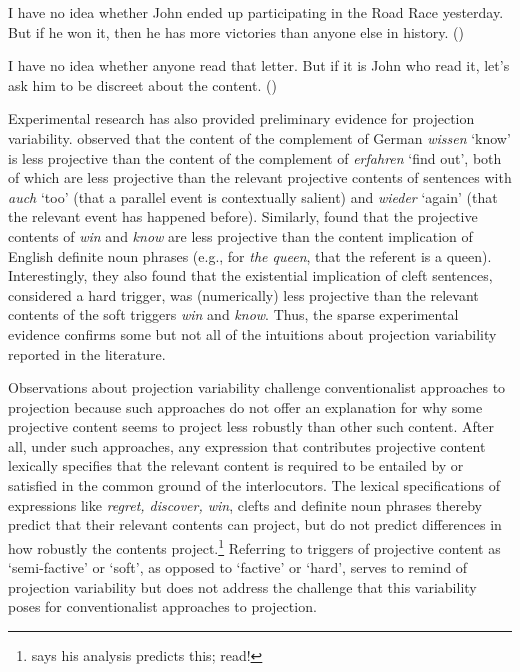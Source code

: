 \documentclass[11pt,fleqn]{article}
\newcommand{\6}{\mbox{$[\hspace*{-.6mm}[$}}
\newcommand{\9}{\mbox{$]\hspace*{-.6mm}]$}}
\def\infelic{{\leavevmode\llap{\#}}}
\begin{document}
\begin{exe}
\ex\label{hardsoft}
\begin{xlist}

\ex I have no idea whether John ended up participating in the Road Race yesterday. But if he won it, then he has more victories than anyone else in history. \hfill (\citealt[39]{abusch10})

\ex\infelic I have no idea whether anyone read that letter. But if it is John
who read it, let's ask him to be discreet about the content. \hfill (\citealt[40]{abusch10})

\end{xlist}
\end{exe}

Experimental research has also provided preliminary evidence for projection variability. \citet{xue-onea11} observed that the content of the complement of German {\em wissen} `know' is less projective than the content of the complement of {\em erfahren} `find out', both of which are less projective than the relevant projective contents of sentences with {\em auch} `too' (that a parallel event is contextually salient) and {\em wieder} `again' (that the relevant event has happened before). Similarly, \citet{smith-hall11} found that the projective contents of {\em win} and {\em know} are less projective than the content implication of English definite noun phrases (e.g., for {\em the queen}, that the referent is a queen). Interestingly, they also found that the existential implication of cleft sentences, considered a hard trigger, was (numerically) less projective than the relevant contents of the soft triggers {\em win} and {\em know}. Thus, the sparse experimental evidence confirms some but not all of the intuitions about projection variability reported in the literature.

Observations about projection variability challenge conventionalist approaches to projection because such approaches do not offer an explanation for why some projective content seems to project less robustly than other such content. After all, under such approaches, any expression that contributes projective content lexically specifies that the relevant content is required to be entailed by or satisfied in the common ground of the interlocutors. The lexical specifications of expressions like {\em regret, discover, win}, clefts and definite noun phrases thereby predict that their relevant contents can project, but do not predict differences in how robustly the contents project.\footnote{\citet{schlenker10} says his analysis predicts this; read!} Referring to triggers of projective content as `semi-factive' or `soft', as opposed to `factive' or `hard', serves to remind of projection variability but does not address the challenge that this variability poses for conventionalist approaches to projection.
\end{document}
